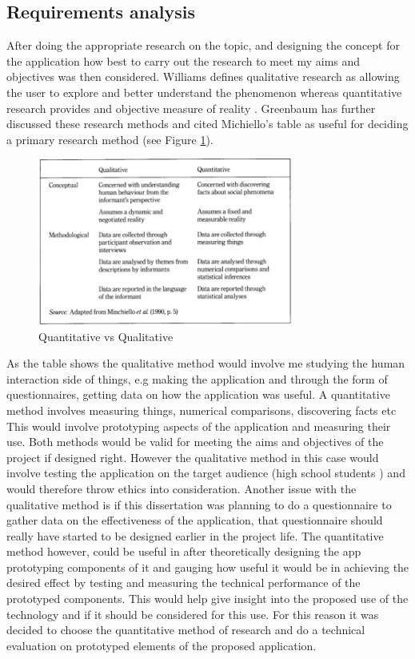 \documentclass[12pt,a4paper]{article}
\begin{document}
\subsection{Requirements analysis} 
After doing the appropriate research on the topic, and designing the concept for the application how best to carry out the research to meet my aims and objectives was then considered. Williams defines qualitative research as allowing the user to explore and better understand the phenomenon whereas quantitative research provides and objective measure of reality \cite{williams2007research}. Greenbaum has further discussed these research methods \cite{greenbaum1999moderating} and cited Michiello's table as useful for deciding a primary research method (see Figure \ref{Research}). 

\begin{figure}[!hb]
    \centering
    \includegraphics[width=0.75\textwidth]{Figs/research.PNG} 
    \caption{Quantitative vs Qualitative} 
    \label{Research}
\end{figure}  

As the table shows the qualitative method would involve me studying the human interaction side of things, e.g making the application and through the form of questionnaires, getting data on how the application was useful. A quantitative method involves measuring things, numerical comparisons, discovering facts etc This would involve prototyping aspects of the application and measuring their use. Both methods would be valid for meeting the aims and objectives of the project if designed right. However the qualitative method in this case would involve testing the application on the target audience (high school students 
) and would therefore throw ethics into consideration. Another issue with the qualitative method is if this dissertation was planning to do a questionnaire to gather data on the effectiveness of the application, that questionnaire should really have  started to be designed earlier in the project life. The quantitative method however, could be useful in after theoretically designing the app prototyping components of it and gauging how useful it would be in achieving the desired effect by testing and measuring the technical performance of the prototyped components. This would help give insight into the proposed use of the technology and if it should be considered for this use. For this reason it was decided to choose the quantitative method of research and do a technical evaluation on prototyped elements of the proposed application.
\end{document}
